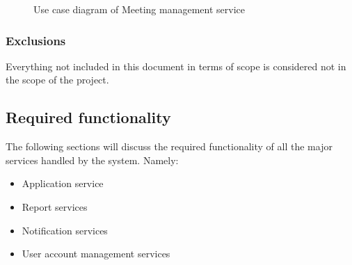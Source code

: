 \documentclass[12pt]{article}
\begin{document}
			\begin{figure}[H]
				\centering				
				\caption{Use case diagram of Meeting management service}
			\end{figure}
		
		\vspace{0.2in}
		\subsubsection{Exclusions}
		\vspace{0.2in}
		Everything not included in this document in terms of scope is considered not in the scope of the project.
		\vspace{0.2in}
		
		\subsection{Required functionality} %
		\vspace{0.2in}
		The following sections will discuss the required functionality of all the major services handled by the system. Namely:
		\begin{itemize}
			\item Application service
			\item Report services
			\item Notification services
			\item User account management services			
		\end{itemize}
		
\end{document}

